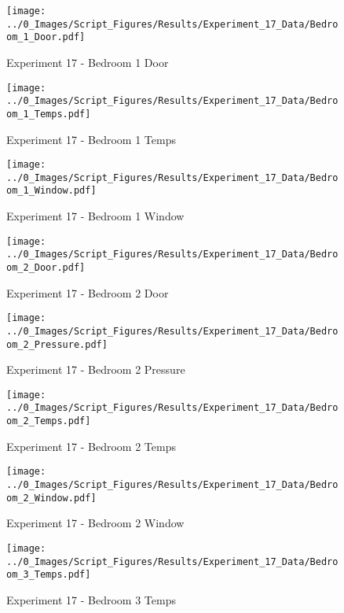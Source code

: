 	\begin{figure}[H]
		\centering
		\texttt{[image: ../0\_Images/Script\_Figures/Results/Experiment\_17\_Data/Bedroom\_1\_Door.pdf]}
		\caption[]{Experiment 17 - Bedroom 1 Door}
	\end{figure}
 

	\begin{figure}[H]
		\centering
		\texttt{[image: ../0\_Images/Script\_Figures/Results/Experiment\_17\_Data/Bedroom\_1\_Temps.pdf]}
		\caption[]{Experiment 17 - Bedroom 1 Temps}
	\end{figure}
 
	\clearpage

	\begin{figure}[H]
		\centering
		\texttt{[image: ../0\_Images/Script\_Figures/Results/Experiment\_17\_Data/Bedroom\_1\_Window.pdf]}
		\caption[]{Experiment 17 - Bedroom 1 Window}
	\end{figure}
 

	\begin{figure}[H]
		\centering
		\texttt{[image: ../0\_Images/Script\_Figures/Results/Experiment\_17\_Data/Bedroom\_2\_Door.pdf]}
		\caption[]{Experiment 17 - Bedroom 2 Door}
	\end{figure}
 
	\clearpage

	\begin{figure}[H]
		\centering
		\texttt{[image: ../0\_Images/Script\_Figures/Results/Experiment\_17\_Data/Bedroom\_2\_Pressure.pdf]}
		\caption[]{Experiment 17 - Bedroom 2 Pressure}
	\end{figure}
 

	\begin{figure}[H]
		\centering
		\texttt{[image: ../0\_Images/Script\_Figures/Results/Experiment\_17\_Data/Bedroom\_2\_Temps.pdf]}
		\caption[]{Experiment 17 - Bedroom 2 Temps}
	\end{figure}
 
	\clearpage

	\begin{figure}[H]
		\centering
		\texttt{[image: ../0\_Images/Script\_Figures/Results/Experiment\_17\_Data/Bedroom\_2\_Window.pdf]}
		\caption[]{Experiment 17 - Bedroom 2 Window}
	\end{figure}
 

	\begin{figure}[H]
		\centering
		\texttt{[image: ../0\_Images/Script\_Figures/Results/Experiment\_17\_Data/Bedroom\_3\_Temps.pdf]}
		\caption[]{Experiment 17 - Bedroom 3 Temps}
	\end{figure}
 
